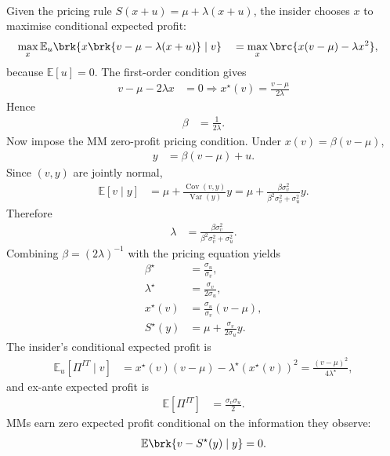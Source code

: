 \begin{model}
\par\smallskip\noindent{}\\
Given the pricing rule $S(x+u)=\mu+\lambda(x+u)$, the insider chooses $x$ to maximise conditional expected profit:
\begin{align*}
\max_x\mathbb{E}_u\brk{x\brk{v-\mu-\lambda(x+u)}\mid v} \quad
&=\max_x\brc{x(v-\mu)-\lambda x^2},
\end{align*}
because $\mathbb{E}[u]=0$. The first-order condition gives
\begin{align*}
v-\mu-2\lambda x&=0 \Rightarrow x^\star(v)=\frac{v-\mu}{2\lambda}
\end{align*}
Hence
\begin{align*}
\beta&=\frac{1}{2\lambda}.
\end{align*}
Now impose the MM zero-profit pricing condition. Under $x(v)=\beta(v-\mu)$,
\begin{align*}
y&=\beta(v-\mu)+u.
\end{align*}
Since $(v,y)$ are jointly normal,
\begin{align*}
\mathbb{E}[v\mid y]
&=\mu+\frac{\operatorname{Cov}(v,y)}{\operatorname{Var}(y)}y=\mu+\frac{\beta\sigma_v^2}{\beta^2\sigma_v^2+\sigma_u^2}y.
\end{align*}
Therefore
\begin{align*}
\lambda&=\frac{\beta\sigma_v^2}{\beta^2\sigma_v^2+\sigma_u^2}.
\end{align*}
Combining $\beta=(2\lambda)^{-1}$ with the pricing equation yields
\begin{align*}
\beta^\star&=\frac{\sigma_u}{\sigma_v},\\
\lambda^\star&=\frac{\sigma_v}{2\sigma_u},\\
x^\star(v)&=\frac{\sigma_u}{\sigma_v}(v-\mu),\\
S^\star(y)&=\mu+\frac{\sigma_v}{2\sigma_u}y.
\end{align*}
The insider's conditional expected profit is
\begin{align*}
\mathbb{E}_u[\Pi^{IT}\mid v]
&=x^\star(v)(v-\mu)-\lambda^\star (x^\star(v))^2
=\frac{(v-\mu)^2}{4\lambda^\star},
\end{align*}
and ex-ante expected profit is
\begin{align*}
\mathbb{E}[\Pi^{IT}]&=\frac{\sigma_v\sigma_u}{2}.
\end{align*}
MMs earn zero expected profit conditional on the information they observe:
\begin{align*}
\mathbb{E}\brk{v-S^\star(y)\mid y}=0.
\end{align*}


\end{model}
